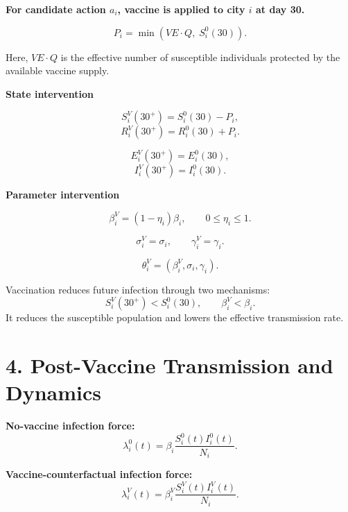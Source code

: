 \documentclass[15pt]{extarticle}
\begin{document}
\textbf{For candidate action \(a_i\), vaccine is applied to city \(i\) at day 30.}

\vspace{0.08cm}

\[
P_i=\min(VE\cdot Q,\;S_i^0(30)).
\]

\begin{tcolorbox}
Here, \(VE\cdot Q\) is the effective number of susceptible individuals protected by the available vaccine supply.
\end{tcolorbox}

\vspace{0.15cm}

\begin{minipage}[t]{0.47\textwidth}
\textbf{State intervention}

\[
S_i^{V}(30^+)=S_i^0(30)-P_i,
\]
\[
R_i^{V}(30^+)=R_i^0(30)+P_i.
\]

\[
E_i^{V}(30^+)=E_i^0(30),
\]
\[
I_i^{V}(30^+)=I_i^0(30).
\]
\end{minipage}
\hfill
\begin{minipage}[t]{0.47\textwidth}
\textbf{Parameter intervention}

\[
\beta_i^{V}=(1-\eta_i)\beta_i,
\qquad 0\leq \eta_i\leq 1.
\]

\[
\sigma_i^{V}=\sigma_i,
\qquad
\gamma_i^{V}=\gamma_i.
\]

\[
\theta_i^{V}=(\beta_i^{V},\sigma_i,\gamma_i).
\]
\end{minipage}

\vspace{0.25cm}

\begin{tcolorbox}
Vaccination reduces future infection through two mechanisms:
\[
S_i^{V}(30^+)<S_i^0(30),
\qquad
\beta_i^{V}<\beta_i.
\]
It reduces the susceptible population and lowers the effective transmission rate.
\end{tcolorbox}


\newpage
\section*{4. Post-Vaccine Transmission and Dynamics}

\textbf{No-vaccine infection force:}
\[
\lambda_i^0(t)
=
\beta_i
\frac{S_i^0(t)I_i^0(t)}{N_i}.
\]

\textbf{Vaccine-counterfactual infection force:}
\[
\lambda_i^{V}(t)
=
\beta_i^{V}
\frac{S_i^{V}(t)I_i^{V}(t)}{N_i}.
\]
\end{document}
